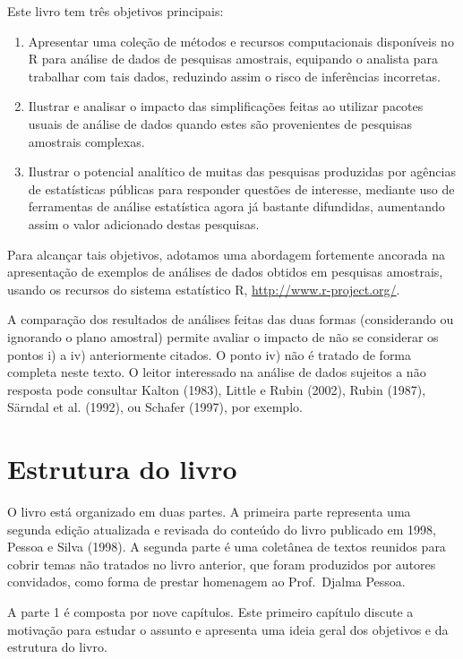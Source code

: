 \documentclass[
  12pt,
  brazilian,
]{book}
\theoremstyle{definition}
\theoremstyle{definition}
\theoremstyle{definition}
\theoremstyle{definition}
\theoremstyle{remark}
\begin{document}
Este livro tem três objetivos principais:

\begin{enumerate}
\def\labelenumi{\arabic{enumi})}
\item
  Apresentar uma coleção de métodos e recursos computacionais disponíveis no R para análise de dados de pesquisas amostrais, equipando o analista para trabalhar com tais dados, reduzindo assim o risco de inferências incorretas.
\item
  Ilustrar e analisar o impacto das simplificações feitas ao utilizar pacotes usuais de análise de dados quando estes são provenientes de pesquisas amostrais complexas.
\item
  Ilustrar o potencial analítico de muitas das pesquisas produzidas por agências de estatísticas públicas para responder questões de interesse, mediante uso de ferramentas de análise estatística agora já bastante difundidas, aumentando assim o valor adicionado destas pesquisas.
\end{enumerate}

Para alcançar tais objetivos, adotamos uma abordagem fortemente ancorada na
apresentação de exemplos de análises de dados obtidos em pesquisas amostrais, usando os recursos do sistema estatístico R, \url{http://www.r-project.org/}.

A comparação dos resultados de análises feitas das duas formas (considerando ou
ignorando o plano amostral) permite avaliar o impacto de não se considerar os pontos i) a iv) anteriormente citados. O ponto iv) não é tratado de forma completa neste texto. O leitor interessado na análise de dados sujeitos a não resposta pode consultar Kalton (1983), Little e Rubin (2002), Rubin (1987), Särndal et al. (1992), ou Schafer (1997), por exemplo.

\hypertarget{estrutura-do-livro}{%
\section{Estrutura do livro}\label{estrutura-do-livro}}

O livro está organizado em duas partes. A primeira parte representa uma segunda edição atualizada e revisada do conteúdo do livro publicado em 1998, Pessoa e Silva (1998). A segunda parte é uma coletânea de textos reunidos para cobrir temas não tratados no livro anterior, que foram produzidos por autores convidados, como forma de prestar homenagem ao Prof.~Djalma Pessoa.

A parte 1 é composta por nove capítulos. Este primeiro capítulo discute a motivação para estudar o assunto e apresenta uma ideia geral dos objetivos e da estrutura do livro.
\end{document}
